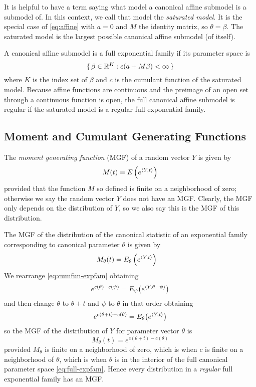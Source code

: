 It is helpful to have a term saying what model a canonical affine submodel
is a submodel of.  In this context, we call that model
the \emph{saturated model}.
It is the special case of \eqref{eq:affine} with $a = 0$ and $M$ the identity
matrix, so $\theta = \beta$.  The saturated model is the largest possible
canonical affine submodel (of itself).

A canonical affine submodel is a full exponential family if its parameter
space is
$$
   \{\,  \beta \in \mathbb{R}^K : c(a + M \beta) < \infty  \,\}
$$
where $K$ is the index set of $\beta$ and $c$ is the cumulant function
of the saturated model.  Because affine functions are continuous
and the preimage of an open set through a continuous function is open,
the full canonical affine submodel is regular if the saturated model is
a regular full exponential family.

\subsection{Moment and Cumulant Generating Functions}

The \emph{moment generating function} (MGF) of a random vector $Y$ is given by
$$
   M(t) = E\left(e^{\langle Y, t \rangle}\right)
$$
provided that the function $M$ so defined is finite on a neighborhood of
zero; otherwise we say the random vector $Y$ does not have an MGF.
Clearly, the MGF only depends on the distribution of $Y$,
so we also say this is the MGF of this distribution.

The MGF of the distribution of the canonical statistic of an exponential
family corresponding to canonical parameter $\theta$ is given by
\begin{align*}
   M_\theta(t)
   & =
   E_\theta\left(e^{\langle Y, t \rangle}\right)
\end{align*}
We rearrange \eqref{eq:cumfun-expfam} obtaining
$$
   e^{c(\theta) - c(\psi)}
   =
   E_\psi\bigl( e^{\langle Y, \theta - \psi \rangle} \bigr)
$$
and then change $\theta$ to $\theta + t$ and $\psi$ to $\theta$ in that order
obtaining
$$
   e^{c(\theta + t) - c(\theta)}
   =
   E_\theta\bigl( e^{\langle Y, t \rangle} \bigr)
$$
so the MGF of the distribution of $Y$ for parameter vector $\theta$ is
$$
   M_\theta(t)
   =
   e^{c(\theta + t) - c(\theta)}
$$
provided $M_\theta$ is finite on a neighborhood of zero,
which is when $c$ is finite on a neighborhood of $\theta$,
which is when $\theta$ is in the interior of the full canonical
parameter space \eqref{eq:full-expfam}.
Hence every distribution in a \emph{regular} full exponential
family has an MGF.


